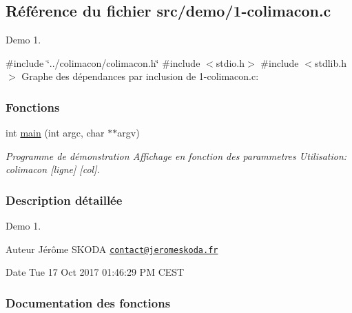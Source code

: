 \hypertarget{1-colimacon_8c}{}\subsection{Référence du fichier src/demo/1-\/colimacon.c}
\label{1-colimacon_8c}


Demo 1.  


{\ttfamily \#include \char`\"{}../colimacon/colimacon.\+h\char`\"{}}\newline
{\ttfamily \#include $<$stdio.\+h$>$}\newline
{\ttfamily \#include $<$stdlib.\+h$>$}\newline
Graphe des dépendances par inclusion de 1-\/colimacon.c\+:
\subsubsection*{Fonctions}
\begin{DoxyCompactItemize}
\item 
int \hyperlink{1-colimacon_8c_a3c04138a5bfe5d72780bb7e82a18e627}{main} (int argc, char $\ast$$\ast$argv)
\begin{DoxyCompactList}\small\item\em Programme de démonstration Affichage en fonction des parammetres Utilisation\+: colimacon \mbox{[}ligne\mbox{]} \mbox{[}col\mbox{]}. \end{DoxyCompactList}\end{DoxyCompactItemize}


\subsubsection{Description détaillée}
Demo 1. 

\begin{DoxyAuthor}{Auteur}
Jérôme S\+K\+O\+DA \href{mailto:contact@jeromeskoda.fr}{\tt contact@jeromeskoda.\+fr} 
\end{DoxyAuthor}
\begin{DoxyDate}{Date}
Tue 17 Oct 2017 01\+:46\+:29 PM C\+E\+ST 
\end{DoxyDate}


\subsubsection{Documentation des fonctions}
\mbox{\label{1-colimacon_8c_a3c04138a5bfe5d72780bb7e82a18e627}} 

